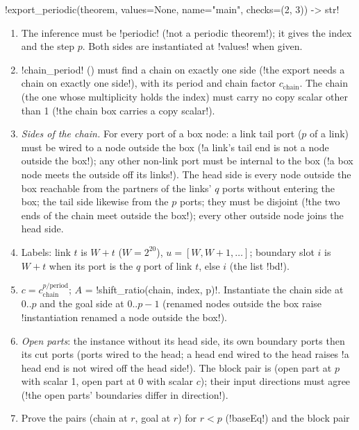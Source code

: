 {{{\begin{signature}
\lexpy!export_periodic(theorem, values=None, name="main", checks=(2, 3)) -> str!
\end{signature}
\begin{algorithm}\label{alg:lean-export-periodic}
\begin{enumerate}
\item The inference must be \lexcode!periodic! (\lexcode!not a periodic theorem!); it gives the index and
the step $p$. Both sides are instantiated at \lexcode!values! when given.
\item \lexpy!chain_period! () must find a chain on exactly one
side (\lexcode!the export needs a chain on exactly one side!), with its period and chain factor
$c_{\mathrm{chain}}$. The chain \bbox (the one whose multiplicity holds the index) must carry no
copy scalar other than 1 (\lexcode!the chain box carries a copy scalar!).
\item \emph{Sides of the chain.} For every port of a box node: a link tail port ($p$ of a link)
must be wired to a node outside the box (\lexcode!a link's tail end is not a node outside the box!); any other non-link port must be internal to the box (\lexcode!a box node meets the outside off its links!). The head side is every node outside the box reachable from the partners of the
links' $q$ ports without entering the box; the tail side likewise from the $p$ ports; they must
be disjoint (\lexcode!the two ends of the chain meet outside the box!); every other outside node joins
the head side.
\item Labels: link $t$ is $W+t$ ($W = 2^{20}$), $u = [W, W+1, \ldots]$; boundary slot $i$ is
$W + t$ when its port is the $q$ port of link $t$, else $i$ (the list \lexlean!bd!).
\item $c = c_{\mathrm{chain}}^{p/\mathrm{period}}$; $A$ = \lexpy!shift_ratio(chain, index, p)!.
Instantiate the chain side at $0..p$ and the goal side at $0..p-1$ (renamed nodes outside the
box raise \lexcode!instantiation renamed a node outside the box!).
\item \emph{Open parts}: the instance without its head side, its own boundary ports then its cut
ports (ports wired to the head; a head end wired to the head raises \lexcode!a head end is not wired off the head side!). The block pair is (open part at $p$ with scalar 1, open part at $0$ with
scalar $c$); their input directions must agree (\lexcode!the open parts' boundaries differ in direction!).
\item Prove the pairs (chain at $r$, goal at $r$) for $r<p$ (\lexlean!baseEq!) and the block pair

\end{enumerate}
\end{algorithm}}}}
